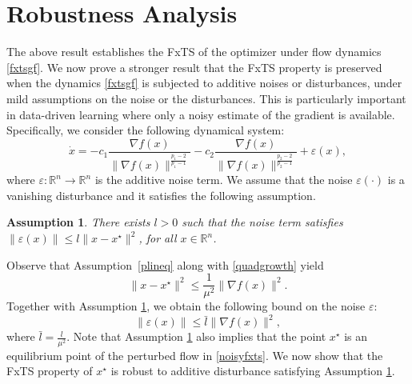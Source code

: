 \documentclass[letterpaper]{article}
\newtheorem{assumption}{Assumption}
\begin{document}


\section{Robustness Analysis}
The above result establishes the FxTS of the optimizer under flow dynamics \eqref{fxtsgf}. We now prove a stronger result that the FxTS property is preserved when the dynamics \eqref{fxtsgf} is subjected to additive noises or disturbances, under mild assumptions on the noise or the disturbances. This is particularly important in data-driven learning where only a noisy estimate of the gradient is available. Specifically, we consider the following dynamical system:
\begin{equation} \label{noisyfxts}
\dot{x}= -c_1\frac{\nabla f(x)}{\|\nabla f(x)\|^{\frac{p_1-2}{p_1-1}}} -c_2\frac{\nabla f(x)}{\|\nabla f(x)\|^{\frac{p_2-2}{p_2-1}}} + \varepsilon (x),
\end{equation}
where $\varepsilon:\mathbb
R^n\rightarrow\mathbb R^n$ is the additive noise term. We assume that the noise $\varepsilon(\cdot)$ is a vanishing disturbance and it satisfies the following assumption.
\begin{assumption} \label{as:noiseterm}
    There exists $l>0$ such that the noise term satisfies $\|\varepsilon (x)\|\leq l\|x-x^\star\|^2$, for all $x\in\mathbb{R}^n$.
\end{assumption}

\noindent Observe that Assumption~\ref{plineq} along with \eqref{quadgrowth} yield
\begin{equation*}
    \|x-x^\star\|^2 \leq \frac{1}{\mu^2}\|\nabla f(x)\|^2.
\end{equation*}
Together with Assumption \ref{as:noiseterm}, we obtain the following bound on the noise $\varepsilon$:
\begin{equation} \label{eq: noisebound2}
\|\varepsilon(x)\| \leq  \bar{l}\|\nabla f(x)\|^2 ,
\end{equation}
where $\bar{l}=\frac{l}{\mu^2}$. Note that Assumption \ref{as:noiseterm} also implies that the point $x^\star$ is an equilibrium point of the perturbed flow in \eqref{noisyfxts}. We now show that the FxTS property of $x^\star$ is robust to additive disturbance satisfying Assumption \ref{as:noiseterm}.
\end{document}
